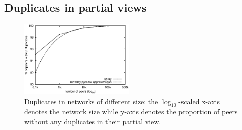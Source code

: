 \subsection{Duplicates in partial views}
\label{subsec:duplicates}

\begin{figure}
  \centering
  \includegraphics[width=0.49\textwidth]{img/duplicates.eps}
  \caption{\label{fig:duplicates}Duplicates in networks of different size: the
    $\log_{10}$-scaled x-axis denotes the network size while y-axis denotes the
    proportion of peers without any duplicates in their partial view.}
\end{figure}

